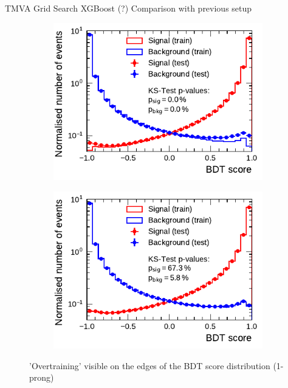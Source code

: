 TMVA Grid Search
XGBoost (?)
Comparison with previous setup

\begin{figure}[ht]
  \begin{subfigure}[t]{0.48\textwidth}
    \centering
    \includegraphics{./figures/bdt_perf/scores/grid_1p0304.pdf}
  \end{subfigure}\hfill
  \begin{subfigure}[t]{0.48\textwidth}
    \centering
    \includegraphics{./figures/bdt_perf/scores/grid_1p_subsampling0269.pdf}
  \end{subfigure}
  \caption{'Overtraining' visible on the edges of the BDT score distribution
    (1-prong)}
  \label{fig:bdt_1p_scores}
\end{figure}

